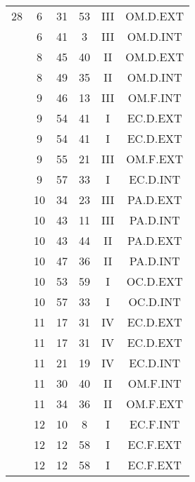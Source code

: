 \documentclass[12pt, a4paper]{article}
\begin{document}
\begin{multicols}{3}
{\begin{tabular}{c c c c c c}
	 	 	 	28 & 6 & 31 & 53 & III & OM.D.EXT\\%
	 	 	 	 & 6 & 41 & 3 & III & OM.D.INT\\%
	 	 	 	 & 8 & 45 & 40 & II & OM.D.EXT\\%
	 	 	 	 & 8 & 49 & 35 & II & OM.D.INT\\%
	 	 	 	 & 9 & 46 & 13 & III & OM.F.INT\\%
	 	 	 	 & 9 & 54 & 41 & I & EC.D.EXT\\%
	 	 	 	 & 9 & 54 & 41 & I & EC.D.EXT\\%
	 	 	 	 & 9 & 55 & 21 & III & OM.F.EXT\\%
	 	 	 	 & 9 & 57 & 33 & I & EC.D.INT\\%
	 	 	 	 & 10 & 34 & 23 & III & PA.D.EXT\\%
	 	 	 	 & 10 & 43 & 11 & III & PA.D.INT\\%
	 	 	 	 & 10 & 43 & 44 & II & PA.D.EXT\\%
	 	 	 	 & 10 & 47 & 36 & II & PA.D.INT\\%
	 	 	 	 & 10 & 53 & 59 & I & OC.D.EXT\\%
	 	 	 	 & 10 & 57 & 33 & I & OC.D.INT\\%
	 	 	 	 & 11 & 17 & 31 & IV & EC.D.EXT\\%
	 	 	 	 & 11 & 17 & 31 & IV & EC.D.EXT\\%
	 	 	 	 & 11 & 21 & 19 & IV & EC.D.INT\\%
	 	 	 	 & 11 & 30 & 40 & II & OM.F.INT\\%
	 	 	 	 & 11 & 34 & 36 & II & OM.F.EXT\\%
	 	 	 	 & 12 & 10 & 8 & I & EC.F.INT\\%
	 	 	 	 & 12 & 12 & 58 & I & EC.F.EXT\\%
	 	 	 	 & 12 & 12 & 58 & I & EC.F.EXT\\%

\end{tabular}}
\end{multicols}
\end{document}
